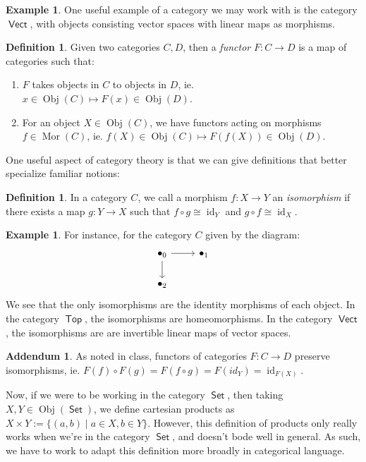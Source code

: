 \documentclass[leqno, openany]{memoir}
\theoremstyle{definition}
\newtheorem{defn}[thm]{Definition}
\newtheorem{exm}[thm]{Example}
\theoremstyle{remark}
\theoremstyle{plain}
\theoremstyle{definition}
\newtheorem*{exm*}{Example}
\newtheorem*{addm*}{Addendum}
\theoremstyle{remark}
\newcommand{\iso}{\cong}
\DeclareMathOperator{\Top}{\mathsf{Top}}
\DeclareMathOperator{\Vect}{\mathsf{Vect}}
\DeclareMathOperator{\Sets}{\mathsf{Set}}
\DeclareMathOperator{\Obj}{Obj}
\DeclareMathOperator{\Mor}{Mor}
\DeclareMathOperator{\id}{id}
\begin{document}
\begin{exm}
    One useful example of a category we may work with is the category $\Vect$, with objects consisting vector spaces with linear maps as morphisms. 
\end{exm}

\begin{defn}
    Given two categories $C, D$, then a \emph{functor} $F: C \to D$ is a map of categories such that: 
    \begin{enumerate}
        \item $F$ takes objects in $C$ to objects in $D$, ie. $x \in \Obj(C) \mapsto F(x) \in \Obj(D)$.
        \item For an object $X \in \Obj(C)$, we have functors acting on morphisms $f \in \Mor(C)$, ie. $f(X) \in \Obj(C) \mapsto F(f(X)) \in \Obj(D)$.
    \end{enumerate}
\end{defn}
One useful aspect of category theory is that we can give definitions that better specialize familiar notions:

\begin{defn}
    In a category $C$, we call a morphism $f: X \to Y$ an \emph{isomorphism} if there exists a map $g: Y \to X$ such that $f \circ g \iso \id_Y$ and $g \circ f \iso \id_X$. 
\end{defn}
\begin{exm*}
    For instance, for the category $C$ given by the diagram:
    \[\begin{tikzcd}
        \bullet_0 \arrow[r] \arrow[d] & \bullet_1 \\ \bullet_2
    \end{tikzcd}\]
    We see that the only isomorphisms are the identity morphisms of each object. In the category $\Top$, the isomorphisms are homeomorphisms. In the category $\Vect$, the isomorphisms are are invertible linear maps of vector spaces.
\end{exm*}

\begin{addm*}
    As noted in class, functors of categories $F: C \to D$ preserve isomorphisms, ie. $F(f) \circ F(g) = F(f \circ g) = F(id_Y)= \id_{F(X)}$.
\end{addm*}
\par 
Now, if we were to be working in the category $\Sets$, then taking $X, Y \in \Obj(\Sets)$, we define cartesian products as $X \times Y  := \{ (a,b) \mid a \in X, b \in Y\}$. However, this definition of products only really works when we're in the category $\Sets$, and doesn't bode well in general. As such, we have to work to adapt this definition more broadly in categorical language. 
\end{document}
